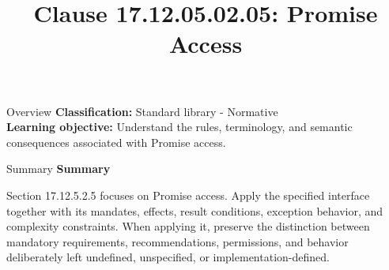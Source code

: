 \documentclass[10pt,letterpaper]{article}
\title{Clause 17.12.05.02.05: Promise Access}
\author{}
\date{}
\begin{document}
\maketitle
\begin{CornellOverviewBox}{Overview}
\textbf{Classification:} Standard library - Normative\\[2pt]
\textbf{Learning objective:} Understand the rules, terminology, and semantic consequences associated with Promise access.
\end{CornellOverviewBox}\begin{CornellSummaryBox}{Summary}
{\sffamily\bfseries\color{Accent} Summary}\par\vspace{3pt}Section 17.12.5.2.5 focuses on Promise access. Apply the specified interface together with its mandates, effects, result conditions, exception behavior, and complexity constraints. When applying it, preserve the distinction between mandatory requirements, recommendations, permissions, and behavior deliberately left undefined, unspecified, or implementation-defined.
\end{CornellSummaryBox}
\end{document}
